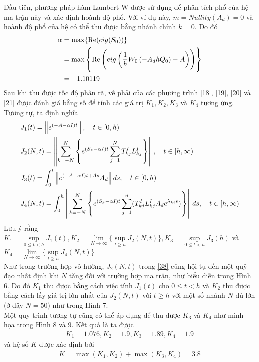 \begin{vd}
\begin{figure}[h!]
	\label{fig:hinh-19}
\end{figure}
Đầu tiên, phương pháp hàm Lambert W được sử dụng để phân tích phổ của hệ ma trận này và xác định hoành độ phổ. Với ví dụ này, $m = Nullity(A_d) =0$ và hoành độ phổ của hệ có thể thu được bằng nhánh chính $k =0$. Do đó
\begin{align}\label{46}
	\alpha &= \max \{ \mathrm{Re}(eig(S_0))\} \notag\\
	& = \max\left\{\mathrm{Re} \left(eig \left(\dfrac{1}{h} W_0\left( -A_dhQ_0\right) - A\right) \right) \right\}	\notag \\
	& = -1.10119	
\end{align}
Sau khi thu được tốc độ phân rã, vế phải của các phương trình \eqref{18}, \eqref{19}, \eqref{20} và \eqref{21} được đánh giá bằng số để tính các giá trị $K_1, K_2, K_3$ và $K_4$ tương ứng. Tương tự, ta định nghĩa
\begin{align}
	&J_1(t) = \left \Vert e^{(-A-\alpha I)t} \right\Vert, \quad t \in [0,h)\\
	&J_2(N, t) = \left\Vert \sum_{k=-N}^N\left\{e^{(S_k-\alpha I)t} \sum_{j=1}^N T^I_{kj}L^I_{kj} \right\} \right\Vert, \quad t \in [h, \infty)\\
	&J_3(t) = \int_0^t\left\Vert e^{(-A-\alpha I)t+As }A_d\right\Vert ds , \quad t \in [0,h)\\
	&J_4(N,t)= \int^h_0 \left\Vert \sum_{k=-N}^N \left\{e^{(S_k-\alpha I)t} \sum_{j =1}^n(T^I_{kj}L^I_{kj}A_de^{\lambda_{ki}s })\right\}\right\Vert ds , \quad t \in [h, \infty)
 \end{align}
Lưu ý rằng $K_1 =\sup\limits_{0 \le t <h}J_1(t), K_2 = \lim\limits_{N\to \infty} \{\sup\limits_{t \ge h}J_2(N,t)\}, K_3 = \sup\limits_{0 \le t <h}J_3(h)$ và $K_4 = \lim\limits_{N\to \infty} \{\sup\limits_{t \ge h}J_4(N,t)\}$\\
Như trong trường hợp vô hướng, $J_2(N,t)$ trong \eqref{38} cũng hội tụ  đến một quỹ đạo nhất định khi $N$ tăng đối với trường hợp ma trận, như biểu diễn trong Hình 6. Do đó $K_1$ thu được bằng cách việc tính $J_1(t)$ cho $0 \le t<h$ và $K_2$ thu được bằng cách lấy giá trị lớn nhất của $J_2(N,t)$ với $t \ge h$ với một số nhánh $N$ đủ lớn (ở đây $N = 50$) như trong Hình 7.\\
Một quy trình tương tự cũng có thể áp dụng để thu được $K_3$ và $K_4$ như minh họa trong Hình 8 và 9. Kết quả là ta được
\begin{align*}
	K_1 = 1.076, K_2 = 1.9, K_3 = 1.89, K_4 = 1.9
\end{align*}
và hệ số $K$ được xác định bởi 
\begin{align*}
	K = \max(K_1, K_2) + \max(K_3, K_4) = 3.8

\end{align*}
\end{vd}

